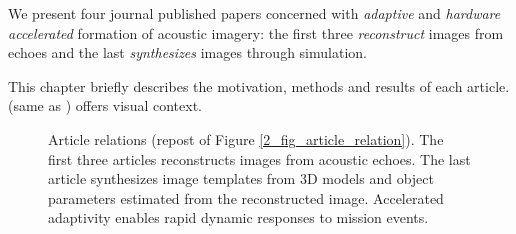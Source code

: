 %
%


We present four journal published papers concerned with \emph{adaptive} and \emph{hardware accelerated} formation of acoustic imagery: the first three \emph{reconstruct} images from echoes and the last \emph{synthesizes} images through simulation.

This chapter briefly describes the motivation, methods and results of each article.  (same as ) offers visual context.

\begin{figure}[tp]
\caption{Article relations (repost of Figure \ref{2_fig_article_relation}). The first three articles reconstructs images from acoustic echoes. The last article synthesizes image templates from 3D models and object parameters estimated from the reconstructed image. Accelerated adaptivity enables rapid dynamic responses to mission events. }\label{3_fig_article_relation}
\end{figure}


%
%


%

